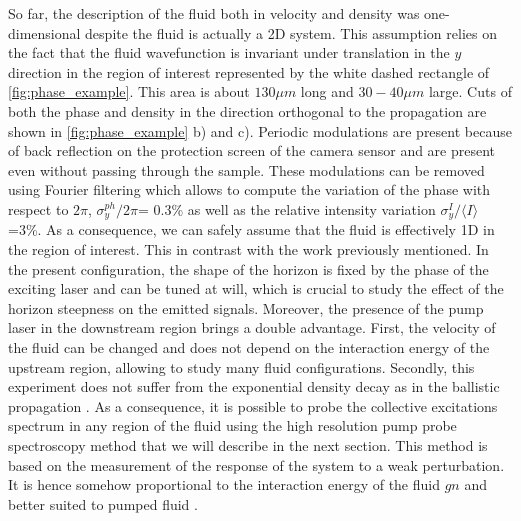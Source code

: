 So far, the description of the fluid both in velocity and density was one-dimensional despite the fluid is actually a 2D system. This assumption
relies on the fact that the fluid wavefunction is invariant under translation in the $y$ direction in the region of interest represented by the white dashed rectangle of \autoref{fig:phase_example}. This area is about $130 \mu m$ long and $30-40 \mu m $ large. 
Cuts of both the phase and density in the direction orthogonal to the propagation are shown in \autoref{fig:phase_example} b) and c). Periodic modulations are present because of back reflection on the protection screen of the camera sensor and are present even without passing through the sample. These modulations can be removed
using Fourier filtering which allows to compute the variation of the phase with respect to $2\pi$,  $\sigma_y^{ph}/2\pi$= 0.3\% as well as the relative intensity variation $\sigma_y^I/\langle I \rangle$ =3\%. As a consequence,
we can safely assume that the fluid is effectively 1D in the region of interest. This in contrast with the work \cite{nguyen_acoustic_2015} previously mentioned. In the present configuration, the shape of the horizon is fixed by the phase of the exciting laser and can be tuned at will, which is crucial to
study the effect of the horizon steepness on the emitted signals. Moreover, the presence of the pump laser in the downstream region brings a double advantage. First, the velocity of the fluid can be changed and does not depend on the interaction energy of the upstream region, allowing to study many fluid configurations.
Secondly, this experiment does not suffer from the exponential density decay as in the ballistic propagation \cite{long_range_ballistic_2013}. As a consequence, it is possible to probe the collective excitations spectrum in any region of the fluid using the high resolution pump probe spectroscopy method that we will describe in the next section. This 
 method is based on the measurement of the response of the system to a weak perturbation. It is hence somehow proportional to the interaction energy of the fluid $gn$ and better suited to pumped fluid \cite{claude_high-resolution_2022}.

